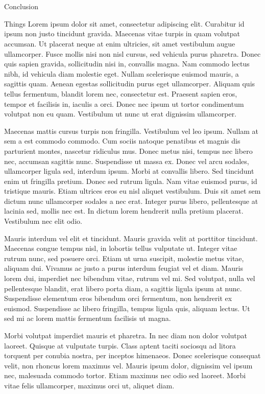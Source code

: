 \documentclass[12pt]{beamer}
\renewcommand{\maketitle}{%
	\begin{center}%
		\Huge\inserttitle\\[5mm]%
		\Large\insertauthor\\[5mm]%
		\Large\insertinstitute%
	\end{center}%
	\vspace*{-1ex}%
}
\begin{document}
\begin{frame}{\maketitle}
\begin{columns}
\begin{column}{.45\textwidth}
\begin{exampleblock}{Conclusion}
				\end{exampleblock}
				\vspace{1em}
				\begin{block}{Things}
					Lorem ipsum dolor sit amet, consectetur adipiscing elit. Curabitur id ipsum non justo tincidunt gravida. Maecenas vitae turpis in quam volutpat accumsan. Ut placerat neque at enim ultricies, sit amet vestibulum augue ullamcorper. Fusce mollis nisi non nisl cursus, sed vehicula purus pharetra. Donec quis sapien gravida, sollicitudin nisi in, convallis magna. Nam commodo lectus nibh, id vehicula diam molestie eget. Nullam scelerisque euismod mauris, a sagittis quam. Aenean egestas sollicitudin purus eget ullamcorper. Aliquam quis tellus fermentum, blandit lorem nec, consectetur est. Praesent sapien eros, tempor et facilisis in, iaculis a orci. Donec nec ipsum ut tortor condimentum volutpat non eu quam. Vestibulum ut nunc ut erat dignissim ullamcorper.

					Maecenas mattis cursus turpis non fringilla. Vestibulum vel leo ipsum. Nullam at sem a est commodo commodo. Cum sociis natoque penatibus et magnis dis parturient montes, nascetur ridiculus mus. Donec metus nisi, tempus nec libero nec, accumsan sagittis nunc. Suspendisse ut massa ex. Donec vel arcu sodales, ullamcorper ligula sed, interdum ipsum. Morbi at convallis libero. Sed tincidunt enim ut fringilla pretium. Donec sed rutrum ligula. Nam vitae euismod purus, id tristique mauris. Etiam ultrices eros eu nisl aliquet vestibulum. Duis sit amet sem dictum nunc ullamcorper sodales a nec erat. Integer purus libero, pellentesque at lacinia sed, mollis nec est. In dictum lorem hendrerit nulla pretium placerat. Vestibulum nec elit odio.

					Mauris interdum vel elit et tincidunt. Mauris gravida velit at porttitor tincidunt. Maecenas congue tempus nisl, in lobortis tellus vulputate ut. Integer vitae rutrum nunc, sed posuere orci. Etiam ut urna suscipit, molestie metus vitae, aliquam dui. Vivamus ac justo a purus interdum feugiat vel et diam. Mauris lorem dui, imperdiet nec bibendum vitae, rutrum vel mi. Sed volutpat, nulla vel pellentesque blandit, erat libero porta diam, a sagittis ligula ipsum at nunc. Suspendisse elementum eros bibendum orci fermentum, non hendrerit ex euismod. Suspendisse ac libero fringilla, tempus ligula quis, aliquam lectus. Ut sed mi ac lorem mattis fermentum facilisis ut magna.

					Morbi volutpat imperdiet mauris et pharetra. In nec diam non dolor volutpat laoreet. Quisque at vulputate turpis. Class aptent taciti sociosqu ad litora torquent per conubia nostra, per inceptos himenaeos. Donec scelerisque consequat velit, non rhoncus lorem maximus vel. Mauris ipsum dolor, dignissim vel ipsum nec, malesuada commodo tortor. Etiam maximus nec odio sed laoreet. Morbi vitae felis ullamcorper, maximus orci ut, aliquet diam.


\end{block}
\end{column}
\end{columns}
\end{frame}
\end{document}

